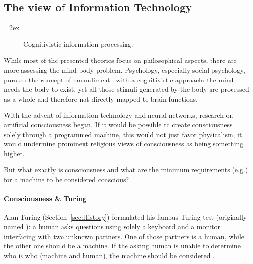 

\subsection{The view of Information Technology}

{\columnsep=2ex\begin{wrapfigure}[11]{r}{.45\linewidth}
\vspace*{-.9\baselineskip}
\caption{Cognitivistic information processing.}
\end{wrapfigure}
While most of the presented theories focus on philosophical aspects, there are more assessing the mind-body problem.
Psychology, especially social psychology, pursues the concept of embodiment~\cite{meier2012embodiment} with a cognitivistic approach:
the mind needs the body to exist, yet all those stimuli generated by the body are processed as a whole and therefore not directly mapped to brain functions.\par}

With the advent of information technology and neural networks, research on artificial consciousness began. If it would be possible to create consciousness solely through a programmed machine, this would not just favor physicalism, it would undermine prominent religious views of consciousness as being something higher.

But what exactly is consciousness and what are the minimum requirements (e.g.) for a machine to be considered conscious?

\paragraph{Consciousness \& Turing} Alan Turing (Section~\ref{sec:History}) formulated his famous Turing test (originally named ): a human asks questions using solely a keyboard and a monitor interfacing with two unknown partners. One of those partners is a human, while the other one should be a machine. If the asking human is unable to determine who is who (machine and human), the machine should be considered .

